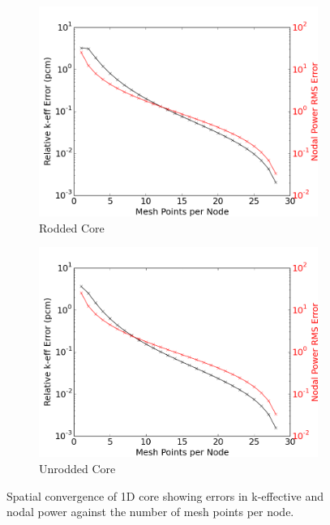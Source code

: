 \documentclass[12pt]{report}
\begin{document}
	
			\begin{figure}[ht]
				\centering
				\begin{subfigure}{.5\textwidth}
					\centering
					\includegraphics[width=.9\linewidth]{log_mesh_refinement_errors.png}
					\caption{Rodded Core}
					\label{fig::rod_sp_conv}
				\end{subfigure}%
				\begin{subfigure}{.5\textwidth}
					\centering
					\includegraphics[width=.9\linewidth]{urod_log_mesh_refinement_errors.png}
					\caption{Unrodded Core}
					\label{fig::urod_sp_conv}
				\end{subfigure}
				\caption{Spatial convergence of 1D core showing errors in k-effective and nodal power against the number of mesh points per node.}
				\label{fig::spatial_convergence}
			\end{figure}
	
\end{document}
